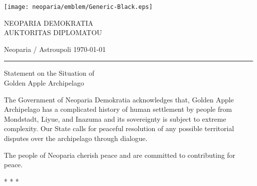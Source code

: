 \documentclass[a4paper,12pt]{article}
\newcommand{\makehead}[4]{
    \begin{minipage}{\linewidth}
        \center
        \sffamily
        \small
        {\hfill{\texttt{[image: neoparia/emblem/Generic-Black.eps]}}\hfill}
        \vspace{6mm}

        \MakeTextUppercase{#1}
        \vspace{11mm}
    \end{minipage}

    {\sffamily\footnotesize #3 \hfill #4}%

    \vspace{2mm}
    \hrule
    \vspace{15mm}

    \begin{minipage}{\linewidth}
        \center
        \sffamily
        \Large
        #2
        \vspace{12mm}
    \end{minipage}
    
    
    \rmfamily
}
\newcommand{\makeeof}[0]{
    \vspace{9mm}
    \begin{minipage}{\linewidth}
        \center
        * * *
    \end{minipage}
}
\begin{document}
\pagestyle{empty}
\makehead{Neoparia Demokratia\\Auktoritas Diplomatou}{Statement on the Situation of\\ Golden Apple Archipelago}{Neoparia / Astroupoli}{\today}

The Government of Neoparia Demokratia acknowledges that,
Golden Apple Archipelago has a complicated history of human settlement \textemdash{} by people from Mondstadt, Liyue, and Inazuma \textemdash{}
and its sovereignty is subject to extreme complexity.
Our State calls for peaceful resolution of any possible territorial disputes over the archipelago through dialogue.

The people of Neoparia cherish peace and are committed to contributing for peace.

\makeeof
\end{document}
